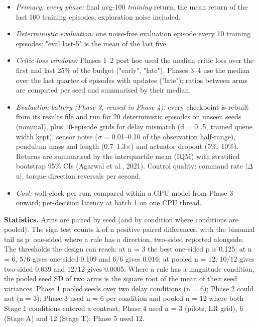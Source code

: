 \documentclass[11pt]{article}
\begin{document}
\begin{itemize}
\item \emph{Primary, every phase:} final avg-100 \emph{training} return, the mean return of the last 100 training episodes, exploration noise included.
\item \emph{Deterministic evaluation:} one noise-free evaluation episode every 10 training episodes; "eval last-5" is the mean of the last five.
\item \emph{Critic-loss windows:} Phases 1--2 post hoc used the median critic loss over the first and last 25\% of the budget ("early", "late"). Phases 3--4 use the median over the last quarter of episodes with updates ("late"); ratios between arms are computed per seed and summarised by their median.
\item \emph{Evaluation battery (Phase 3, reused in Phase 4):} every checkpoint is rebuilt from its results file and run for 20 deterministic episodes on unseen seeds (nominal), plus 10-episode grids for delay mismatch (d = 0\ldots{}5, trained queue width kept), sensor noise ($\sigma$ = 0.01--0.10 of the observation half-range), pendulum mass and length (0.7--1.3$\times$) and actuator dropout (5\%, 10\%). Returns are summarised by the interquartile mean (IQM) with stratified bootstrap 95\% CIs (Agarwal et al., 2021). Control quality: command rate |$\Delta$u|, torque direction reversals per second.
\item \emph{Cost:} wall-clock per run, compared within a GPU model from Phase 3 onward; per-decision latency at batch 1 on one CPU thread.
\end{itemize}



\textbf{Statistics.} Arms are paired by seed (and by condition where conditions are pooled). The sign test counts k of n positive paired differences, with the binomial tail as p: one-sided where a rule has a direction, two-sided reported alongside. The thresholds the design can reach: at n = 3 the best one-sided p is 0.125; at n = 6, 5/6 gives one-sided 0.109 and 6/6 gives 0.016; at pooled n = 12, 10/12 gives two-sided 0.039 and 12/12 gives 0.0005. Where a rule has a magnitude condition, the pooled seed SD of two arms is the square root of the mean of their seed variances. Phase 1 pooled seeds over two delay conditions (n = 6); Phase 2 could not (n = 3); Phase 3 used n = 6 per condition and pooled n = 12 where both Stage 1 conditions entered a contrast; Phase 4 used n = 3 (pilots, LR grid), 6 (Stage A) and 12 (Stage T); Phase 5 used 12.
\end{document}
